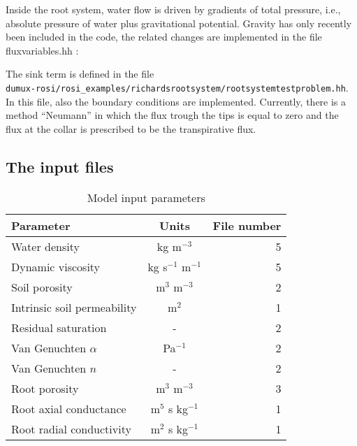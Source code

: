 Inside the root system, water flow is driven by gradients of total pressure, i.e., absolute pressure of water plus gravitational potential. Gravity has only recently been included in the code, the related changes are implemented in the file fluxvariables.hh :
	

The sink term is defined in the file\\
\verb+dumux-rosi/rosi_examples/richardsrootsystem/rootsystemtestproblem.hh+.\\
	

In this file, also the boundary conditions are implemented.
Currently, there is a method “Neumann” in which the flux trough the tips is equal to zero and the flux at the collar is prescribed to be the transpirative flux. 
	


\subsection*{The input files}
% 
\begin{table}[h!]
	\captionsetup{labelformat=empty}
  \caption{Model input parameters}
  \label{tab:inputs}
  \begin{tabular}{l|c||r}
    \textbf{Parameter}  & \textbf{Units} & \textbf{File number}\\
    \hline
    Water density & kg m$^{-3}$ & 5\\
    Dynamic viscosity & kg s$^{-1}$ m$^{-1}$& 5\\		
    Soil porosity & m$^3$ m$^{-3}$ & 2\\		
		Intrinsic soil permeability & m$^2$ & 1\\
		Residual saturation & - & 2\\	
		Van Genuchten $\alpha$ & Pa$^{-1}$ & 2\\
		Van Genuchten $n$ & - & 2\\		
    Root porosity & m$^3$ m$^{-3}$ & 3\\	
		Root axial conductance & m$^5$ s kg$^{-1}$ & 1\\
		Root radial conductivity & m$^2$ s kg$^{-1}$ & 1\\		
  \end{tabular}
\end{table}

